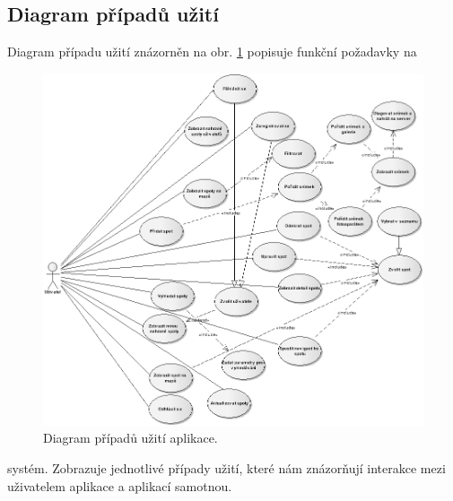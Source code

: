 \documentclass[12pt]{article}
\begin{document}
\subsection{Diagram případů užití}
Diagram případu užití znázorněn na obr. \ref{diagram} popisuje funkční požadavky na
\begin{figure}[ht]
\centerline{\includegraphics[scale=0.5]{images/spotting-diagramBW.png}}
\caption{Diagram případů užití aplikace.} \label{diagram}
\end{figure}
systém. Zobrazuje jednotlivé případy užití, které nám znázorňují interakce mezi uživatelem  aplikace a aplikací samotnou.
\end{document}

